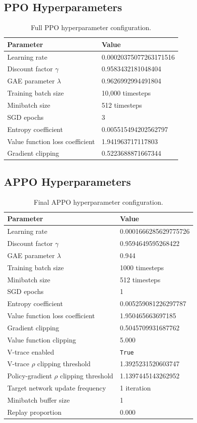 \documentclass[english,bachelor]{hsluthesis}
\begin{document}
\subsection{PPO Hyperparameters}
\begin{table}[H]
\centering
\begin{tabular}{l l}
\hline
Parameter & Value \\
\hline
Learning rate & 0.00020375077263171516 \\
Discount factor $\gamma$ & 0.9583432181048404 \\
GAE parameter $\lambda$ & 0.9626992994491804 \\
Training batch size & 10,000 timesteps \\
Minibatch size & 512 timesteps \\
SGD epochs & 3 \\
Entropy coefficient & 0.005515494202562797 \\
Value function loss coefficient & 1.941963717117803 \\
Gradient clipping & 0.5223688871667344 \\
\hline
\end{tabular}
\caption{Full PPO hyperparameter configuration.}
\label{tab:ppo_hyperparams_full}
\end{table}

\subsection{APPO Hyperparameters}
\begin{table}[H]
\centering
\begin{tabular}{l l}
\hline
Parameter & Value \\
\hline
Learning rate & 0.0001666285629775726 \\
Discount factor $\gamma$ & 0.9594649595268422 \\
GAE parameter $\lambda$ & 0.944 \\
Training batch size & 1000 timesteps \\
Minibatch size & 512 timesteps \\
SGD epochs & 1 \\
Entropy coefficient & 0.005259081226297787 \\
Value function loss coefficient & 1.950465663697185 \\
Gradient clipping & 0.5045709931687762 \\
Value function clipping & 5.000 \\
V-trace enabled & \texttt{True} \\
V-trace $\rho$ clipping threshold & 1.3925231520603747 \\
Policy-gradient $\rho$ clipping threshold & 1.1397445143262952 \\
Target network update frequency & 1 iteration \\
Minibatch buffer size & 1 \\
Replay proportion & 0.000 \\
\hline
\end{tabular}
\caption{Final APPO hyperparameter configuration.}
\label{tab:appo_hyperparams}
\end{table}
\end{document}
